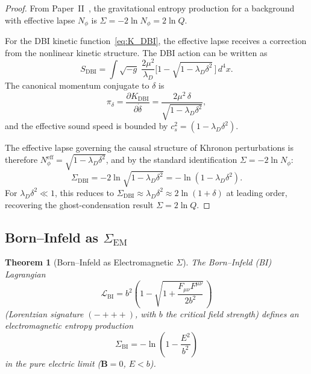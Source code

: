 \documentclass[letterpaper,twocolumn,superscriptaddress,longbibliography]{revtex4-2}
\newtheorem{theorem}{Theorem}[section]
\newcommand{\SEM}{\Sigma_{\mathrm{EM}}}
\newcommand{\SDBI}{\Sigma_{\mathrm{DBI}}}
\newcommand{\SBI}{\Sigma_{\mathrm{BI}}}
\begin{document}
\begin{proof}
From Paper~II~\cite{PaperII}, the gravitational entropy
production for a background with effective lapse $N_\phi$
is $\Sigma = -2\ln N_\phi = 2\ln Q$.

For the DBI kinetic function~\eqref{eq:K_DBI}, the
effective lapse receives a correction from the nonlinear
kinetic structure.  The DBI action can be written as
\begin{equation}
  S_{\mathrm{DBI}}
  = \int \sqrt{-g}\;\frac{2\mu^2}{\lambda_D}
    \bigl[1 - \sqrt{1 - \lambda_D\delta^2}\,\bigr]\,d^4x.
  \label{eq:S_DBI}
\end{equation}
The canonical momentum conjugate to $\delta$ is
\begin{equation}
  \pi_\delta = \frac{\partial K_{\mathrm{DBI}}}{\partial\dot{\delta}}
  = \frac{2\mu^2\,\delta}
         {\sqrt{1 - \lambda_D\delta^2}},
  \label{eq:pi_delta}
\end{equation}
and the effective sound speed is bounded by
$c_s^2 = (1 - \lambda_D\delta^2)$.

The effective lapse governing the causal structure of
Khronon perturbations is therefore
$N_\phi^{\mathrm{eff}} = \sqrt{1 - \lambda_D\delta^2}$,
and by the standard identification $\Sigma = -2\ln N_\phi$:
\begin{equation}
  \SDBI = -2\ln\sqrt{1 - \lambda_D\delta^2}
       = -\ln(1 - \lambda_D\delta^2).
  \label{eq:Sigma_DBI_derived}
\end{equation}
For $\lambda_D\delta^2 \ll 1$, this reduces to
$\SDBI \approx \lambda_D\delta^2 \approx 2\ln(1+\delta)$
at leading order, recovering the ghost-condensation
result $\Sigma = 2\ln Q$.
\end{proof}

\subsection{Born--Infeld as $\SEM$}
\label{sec:BI}

\begin{theorem}[Born--Infeld as Electromagnetic $\Sigma$]
\label{thm:BI}
The Born--Infeld (BI) Lagrangian~\cite{BornInfeld1934}
\begin{equation}
  \mathcal{L}_{\mathrm{BI}}
  = b^2\!\left(1 - \sqrt{1 + \frac{F_{\mu\nu}F^{\mu\nu}}{2b^2}}
  \,\right)
  \label{eq:L_BI}
\end{equation}
(Lorentzian signature $({-}{+}{+}{+})$, with $b$ the
critical field strength) defines an electromagnetic entropy
production
\begin{equation}
  \SBI = -\ln\!\left(1 - \frac{E^2}{b^2}\right)
  \label{eq:Sigma_BI}
\end{equation}
in the pure electric limit ($\bm{B} = 0$, $E < b$).
\end{theorem}
\end{document}
